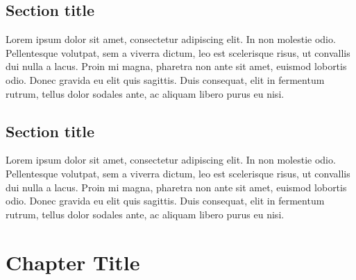 \documentclass[12pt]{report}
\begin{document}

\section{Section title}
Lorem ipsum dolor sit amet, consectetur adipiscing elit. In non molestie odio. Pellentesque volutpat, sem a viverra dictum, leo est scelerisque risus, ut convallis dui nulla a lacus. Proin mi magna, pharetra non ante sit amet, euismod lobortis odio. Donec gravida eu elit quis sagittis. Duis consequat, elit in fermentum rutrum, tellus dolor sodales ante, ac aliquam libero purus eu nisi. 

\section{Section title}
Lorem ipsum dolor sit amet, consectetur adipiscing elit. In non molestie odio. Pellentesque volutpat, sem a viverra dictum, leo est scelerisque risus, ut convallis dui nulla a lacus. Proin mi magna, pharetra non ante sit amet, euismod lobortis odio. Donec gravida eu elit quis sagittis. Duis consequat, elit in fermentum rutrum, tellus dolor sodales ante, ac aliquam libero purus eu nisi. 

\chapter{Chapter Title}
\end{document}

